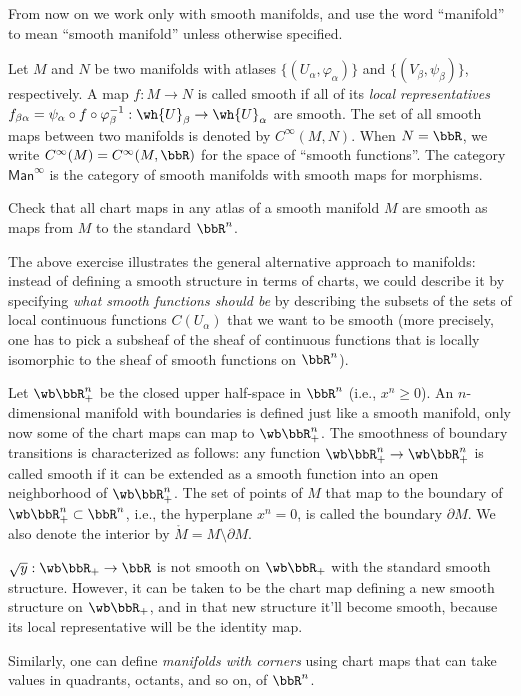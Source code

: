 From now on we work only with smooth manifolds, and use the word ``manifold''  to mean ``smooth manifold'' unless otherwise specified.
\begin{defn}
    Let $M$ and $N$ be two manifolds with atlases $\{(U_\alpha,\varphi_\alpha)\}$ and $\{(V_\beta,\psi_\beta)\}$, respectively. A map $f:M\to N$ is called smooth if all of its \emph{local representatives} $f_{\beta\alpha}=\psi_\alpha\circ f\circ \varphi_\beta^{-1}:\wh{U}_\beta\to \wh{U}_\alpha$ are smooth. The set of all smooth maps between two manifolds is denoted by $C^\infty (M,N)$. When $N=\bbR $, we write $C^\infty(M)=C^\infty (M,\bbR )$ for the space of ``smooth functions''. The category $\mathsf{Man}^\infty$ is the category of smooth manifolds with smooth maps for morphisms.
\end{defn}
\begin{xca}
    Check that all chart maps in any atlas of a smooth manifold $M$ are smooth as maps from $M$ to the standard $\bbR^n$.
\end{xca}
\begin{rem}
    The above exercise illustrates the general alternative approach to manifolds: instead of defining a smooth structure in terms of charts, we could describe it by specifying \emph{what smooth functions should be} by describing the subsets of the sets of local continuous functions $C(U_\alpha)$ that we want to be smooth (more precisely, one has to pick a subsheaf of the sheaf of continuous functions that is locally isomorphic to the sheaf of smooth functions on $\bbR^n$).
\end{rem}
\begin{defn}
    Let $\wb\bbR_+^n$  be the closed upper half-space in $\bbR^n$ (i.e., $x^n\geq 0$). An $n$-dimensional manifold with boundaries is defined just like a smooth manifold, only now some of the chart maps can map to $\wb\bbR_+^n$. The smoothness of boundary transitions is characterized as follows: any function $\wb\bbR_+^n\to \wb\bbR_+^n$ is called smooth if it can be extended as a smooth function into an open neighborhood of $\wb\bbR_+^n$. The set of points of $M$ that map to the boundary of $\wb\bbR_+^n\subset \bbR^n$, i.e., the hyperplane $x^n=0$, is called the boundary $\partial M$. We also denote the interior by $\mathring M=M\setminus \partial M$.
\end{defn}
\begin{example}
    $\sqrt{y}:\wb\bbR_+\to\bbR $ is not smooth on $\wb\bbR_+$ with the standard smooth structure. However, it can be taken to be the chart map defining a new smooth structure on $\wb\bbR_+$, and in that new structure it'll become smooth, because its local representative will be the identity map.
\end{example}
\begin{rem}
    Similarly, one can define \emph{manifolds with corners} using chart maps that can take values in quadrants, octants, and so on, of $\bbR^n$.
\end{rem}

